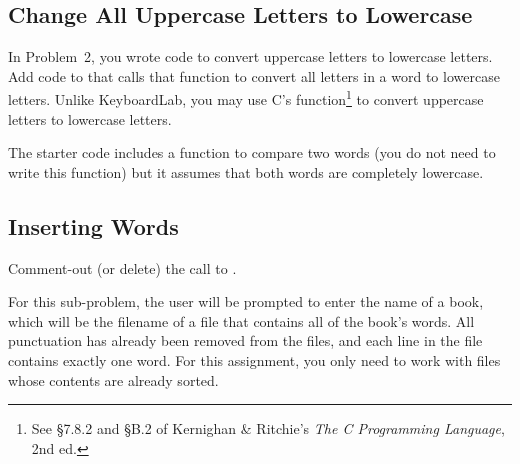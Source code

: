 \subsection{Change All Uppercase Letters to Lowercase}

In Problem~2, you wrote code to convert uppercase letters to lowercase letters.
Add code to  that calls that function to convert all letters in a word to lowercase letters.
Unlike KeyboardLab, you may use C's  function\footnote{See \S7.8.2 and \S{}B.2 of Kernighan \& Ritchie's \textit{The C Programming Language}, 2nd ed.} to convert uppercase letters to lowercase letters.



The starter code includes a function to compare two words (you do not need to write this function) but it assumes that both words are completely lowercase.

%
%

\subsection{Inserting Words} \label{subsec:inserting-words}

Comment-out (or delete) the call to .

For this sub-problem, the user will be prompted to enter the name of a book, which will be the filename of a file that contains all of the book's words.
All punctuation has already been removed from the files, and each line in the file contains exactly one word.
For this assignment, you only need to work with files whose contents are already sorted.




